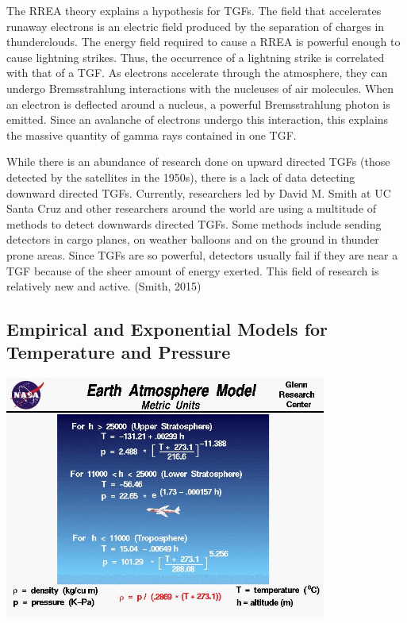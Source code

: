 \documentclass[12pt,]{article}
\begin{document}
The RREA theory explains a hypothesis for TGFs. The field that
accelerates runaway electrons is an electric field produced by the
separation of charges in thunderclouds. The energy field required to
cause a RREA is powerful enough to cause lightning strikes. Thus, the
occurrence of a lightning strike is correlated with that of a TGF. As
electrons accelerate through the atmosphere, they can undergo
Bremsstrahlung interactions with the nucleuses of air molecules. When an
electron is deflected around a nucleus, a powerful Bremsstrahlung photon
is emitted. Since an avalanche of electrons undergo this interaction,
this explains the massive quantity of gamma rays contained in one TGF.

While there is an abundance of research done on upward directed TGFs
(those detected by the satellites in the 1950s), there is a lack of data
detecting downward directed TGFs. Currently, researchers led by David M.
Smith at UC Santa Cruz and other researchers around the world are using
a multitude of methods to detect downwards directed TGFs. Some methods
include sending detectors in cargo planes, on weather balloons and on
the ground in thunder prone areas. Since TGFs are so powerful, detectors
usually fail if they are near a TGF because of the sheer amount of
energy exerted. This field of research is relatively new and active.
(Smith, 2015)

\subsection{Empirical and Exponential Models for Temperature and
Pressure}\label{empirical-and-exponential-models-for-temperature-and-pressure}

\begin{center}\includegraphics[width=400px]{assets/nasa_model} \end{center}
\end{document}
